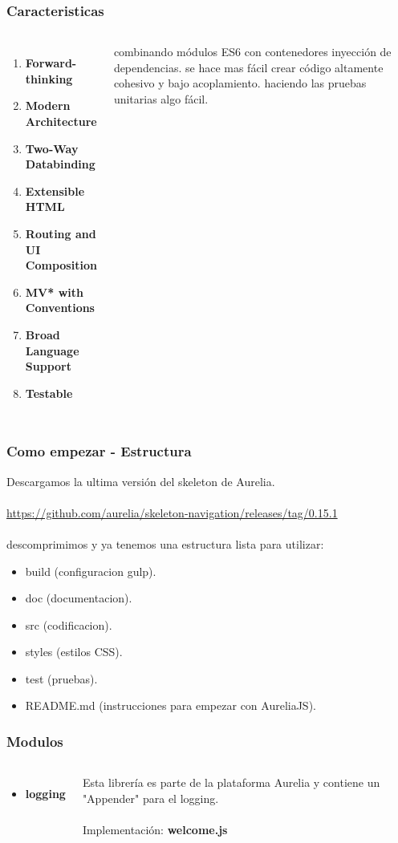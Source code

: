 \documentclass{beamer}
\begin{document}
\begin{frame}
\frametitle{Caracteristicas}
\begin{columns}[c]
\begin{enumerate}
\item \textbf{Forward-thinking}
\item \textbf{Modern Architecture}
\item \textbf{Two-Way Databinding}
\item \textbf{Extensible HTML}
\item \textbf{Routing and UI Composition}
\item \textbf{MV* with Conventions}
\item \textbf{Broad Language Support}
\item \textbf{Testable}
\end{enumerate}
combinando m\'odulos ES6 con contenedores inyecci\'on de dependencias. se hace mas f\'acil crear c\'odigo altamente cohesivo y bajo acoplamiento. haciendo las pruebas unitarias algo f\'acil.
\end{columns}
\end{frame}
\begin{frame}
\frametitle{Como empezar - Estructura}
Descargamos la ultima versi\'on del skeleton de Aurelia.
\\~\\
{\color{blue}\url{https://github.com/aurelia/skeleton-navigation/releases/tag/0.15.1}}
\\~\\
descomprimimos y ya tenemos una estructura lista para utilizar:
\begin{itemize}
\item build (configuracion gulp).
\item doc (documentacion).
\item src (codificacion).
\item styles (estilos CSS).
\item test (pruebas).
\item README.md (instrucciones para empezar con AureliaJS).
\end{itemize}
\end{frame}
\begin{frame}
\frametitle{Modulos}
\begin{columns}[c]
\begin{itemize}
\item \textbf{logging}
\end{itemize}
Esta librer\'ia es parte de la plataforma Aurelia y contiene un "Appender" para el logging.
\\~\\
Implementaci\'on:
\textbf{welcome.js}
\end{columns}
\end{frame}
\end{document}
